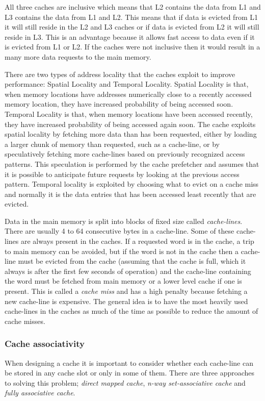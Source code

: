 All three caches are inclusive which means that L2 contains the data from L1 and L3 contains the data from L1 and L2.
This means that if data is evicted from L1 it will still reside in the L2 and L3 caches or if data is evicted from L2 it will still reside in L3. 
This is an advantage because it allows fast access to data even if it is evicted from L1 or L2. 
If the caches were not inclusive then it would result in a many more data requests to the main memory.

There are two types of address locality that the caches exploit to improve performance: Spatial Locality and Temporal Locality.
Spatial Locality is that, when memory locations have addresses numerically close to a recently accessed memory location, they have increased probability of being accessed soon.
Temporal Locality is that, when memory locations have been accessed recently, they have increased probability of being accessed again soon.
The cache exploits spatial locality by fetching more data than has been requested, either by loading a larger chunk of memory than requested, such as a cache-line, or by speculatively fetching more cache-lines based on previously recognized access patterns.  This speculation is performed by the cache prefetcher and assumes that it is possible to anticipate future requests by looking at the previous access pattern.
Temporal locality is exploited by choosing what to evict on a cache miss and normally it is the data entries that has been accessed least recently that are evicted.

Data in the main memory is split into blocks of fixed size called \emph{cache-lines}. 
There are usually 4 to 64 consecutive bytes in a cache-line. 
Some of these cache-lines are always present in the caches. 
If a requested word is in the cache, a trip to main memory can be avoided, but if the word is not in the cache then a cache-line must be evicted from the cache (assuming that the cache is full, which it always is after the first few seconds of operation) and the cache-line containing the word must be fetched from main memory or a lower level cache if one is present. 
This is called a \emph{cache miss} and has a high penalty because fetching a new cache-line is expensive.
The general idea is to have the most heavily used cache-lines in the caches as much of the time as possible to reduce the amount of cache misses.

\subsubsection{Cache associativity}
When designing a cache it is important to consider whether each cache-line can be stored in any cache slot or only in some of them.
There are three approaches to solving this problem; \textit{direct mapped cache}, \textit{n-way set-associative cache} and \textit{fully associative cache}. 

